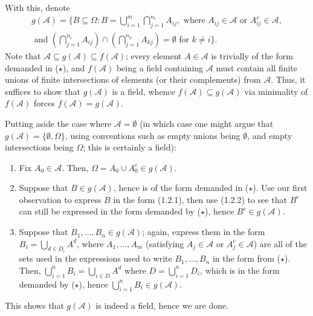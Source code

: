 \documentclass[11pt]{article}
\begin{document}
\begin{enumerate}
        With this, denote \begin{align*}
            g(\mathcal{A}) = \Bigg\{B \subseteq \Omega\colon B = \bigcup_{i = 1}^m\bigcap_{j = 1}^{n_i} A_{ij}, \text{ where } A_{ij} \in \mathcal{A} \text{ or } A_{ij}^c \in \mathcal{A},\\ \text{ and } \left(\bigcap_{j = 1}^{n_i} A_{ij}\right) \cap \left(\bigcap_{j = 1}^{n_k} A_{kj}\right) = \emptyset \text{ for }k \neq i\Bigg\}. \tag{$\star$}
        \end{align*}
        Note that $\mathcal{A} \subseteq g(\mathcal{A}) \subseteq
        f(\mathcal{A})$; every element $A \in \mathcal{A}$ is trivially of the
        form demanded in ($\star$), and $f(\mathcal{A})$ being a field
        containing $\mathcal{A}$ must contain all finite unions of finite
        intersections of elements (or their complements) from $\mathcal{A}$.
        Thus, it suffices to show that $g(\mathcal{A})$ is a field, whence
        $f(\mathcal{A}) \subseteq g(\mathcal{A})$ via minimality of
        $f(\mathcal{A})$ forces $f(\mathcal{A}) = g(\mathcal{A})$.

        Putting aside the case where $\mathcal{A} = \emptyset$ (in which case
        one might argue that $g(\mathcal{A}) = \{\emptyset, \Omega\}$, using
        conventions such as empty unions being $\emptyset$, and empty
        intersections being $\Omega$; this is certainly a field):
        \begin{enumerate}
            \item Fix $A_0 \in \mathcal{A}$.
            Then, $\Omega = A_0 \cup A_0^c \in g(\mathcal{A})$.

            \item Suppose that $B \in g(\mathcal{A})$, hence is of the
            form demanded in ($\star$).
            Use our first observation to express $B$ in the form (1.2.1), then
            use (1.2.2) to see that $B^c$ can still be expressed in the form
            demanded by ($\star$), hence $B^c \in g(\mathcal{A})$.

            \item Suppose that $B_1, \dots, B_n \in g(\mathcal{A})$; again,
            express them in the form $B_i = \bigcup_{d \in D_i} A^d$, where
            $A_1, \dots, A_m$ (satisfying $A_j \in \mathcal{A}$ or $A_j^c \in
            \mathcal{A}$) are all of the sets used in the expressions used to
            write $B_1, \dots, B_n$ in the form from ($\star$).
            Then, $\bigcup_{i = 1}^n B_i = \bigcup_{i \in D} A^d$ where $D =
            \bigcup_{i = 1}^n D_i$, which is in the form demanded by
            ($\star$), hence $\bigcup_{i = 1}^n B_i \in g(\mathcal{A})$.
        \end{enumerate}

    This shows that $g(\mathcal{A})$ is indeed a field, hence we are done.
    \end{enumerate}
\end{document}

